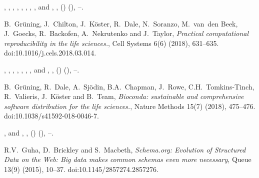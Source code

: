 \documentclass[ds,v1.1.2,openaccess]{iosart2x}%
\begin{document}
\begin{thebibliography}{}
%
\begin{barticle}
,
,
,
,
,
,
,
,
 and
,
,
()
(),
--.
\end{barticle}
%
\OrigBibText
B.~Gr\"{u}ning,
J.~Chilton,
J.~K\"{o}ster,
R.~Dale,
N.~Soranzo,
M.~van~den Beek,
J.~Goecks,
R.~Backofen,
A.~Nekrutenko and
J.~Taylor,
\textit{Practical computational reproducibility in the life sciences.},
Cell Systems
6(6)
(2018),
631--635.
doi:10.1016/j.cels.2018.03.014.
\endOrigBibText
{}
\endbibitem

%
\begin{barticle}
,
,
,
,
,
,
,
 and
,
,
()
(),
--.
\end{barticle}
%
\OrigBibText
B.~Gr\"{u}ning,
R.~Dale,
A.~Sj\"{o}din,
B.A.~Chapman,
J.~Rowe,
C.H.~Tomkins-Tinch,
R.~Valieris,
J.~K\"{o}ster and
B.~Team,
\textit{Bioconda: sustainable and comprehensive software distribution
for the
life sciences.},
Nature Methods
15(7)
(2018),
475--476.
doi:10.1038/s41592-018-0046-7.
\endOrigBibText
{}
\endbibitem

%
\begin{barticle}
,
 and
,
,
()
(),
--.
\end{barticle}
%
\OrigBibText
R.V.~Guha,
D.~Brickley and
S.~Macbeth,
\textit{Schema.org: Evolution of Structured Data on the Web: Big data makes
common schemas even more necessary},
Queue
13(9)
(2015),
10--37.
doi:10.1145/2857274.2857276.
\endOrigBibText
{}
\endbibitem


\end{thebibliography}
\end{document}
